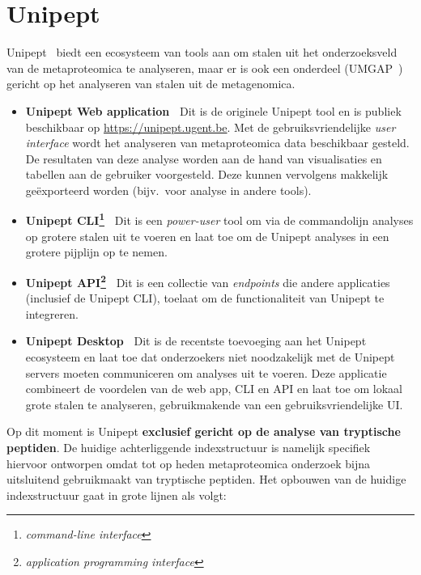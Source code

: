 \section{Unipept}\label{sec:unipept-introductie}
Unipept~\cite{unipept_orig} biedt een ecosysteem van tools aan om stalen uit het onderzoeksveld van de metaproteomica te analyseren, maar er is ook een onderdeel (UMGAP~\cite{UMGAP_paper}) gericht op het analyseren van stalen uit de metagenomica.

\begin{itemize}
    \item \textbf{Unipept Web application~\cite{unipept_orig, unipept_web, unipept_tutorial, unipept_4}} Dit is de originele Unipept tool en is publiek beschikbaar op \url{https://unipept.ugent.be}.
    Met de gebruiksvriendelijke \textit{user interface} wordt het analyseren van metaproteomica data beschikbaar gesteld.
    De resultaten van deze analyse worden aan de hand van visualisaties en tabellen aan de gebruiker voorgesteld.
    Deze kunnen vervolgens makkelijk geëxporteerd worden (bijv.~voor analyse in andere tools).
    \item \textbf{Unipept CLI\footnote{\textit{command-line interface}}~\cite{unipept_cli}} Dit is een \textit{power-user} tool om via de commandolijn analyses op grotere stalen uit te voeren en laat toe om de Unipept analyses in een grotere pijplijn op te nemen.
    \item \textbf{Unipept API\footnote{\textit{application programming interface}}~\cite{unipept_api, unipept_cli}} Dit is een collectie van \textit{endpoints} die andere applicaties (inclusief de Unipept CLI), toelaat om de functionaliteit van Unipept te integreren.
    \item \textbf{Unipept Desktop~\cite{unipept_desktop, unipept_desktop_2}} Dit is de recentste toevoeging aan het Unipept ecosysteem en laat toe dat onderzoekers niet noodzakelijk met de Unipept servers moeten communiceren om analyses uit te voeren.
    Deze applicatie combineert de voordelen van de web app, CLI en API en laat toe om lokaal grote stalen te analyseren, gebruikmakende van een gebruiksvriendelijke UI\@.
\end{itemize}

Op dit moment is Unipept \textbf{exclusief gericht op de analyse van tryptische peptiden}.
De huidige achterliggende indexstructuur is namelijk specifiek hiervoor ontworpen omdat tot op heden metaproteomica onderzoek bijna uitsluitend gebruikmaakt van tryptische peptiden.
Het opbouwen van de huidige indexstructuur gaat in grote lijnen als volgt:

